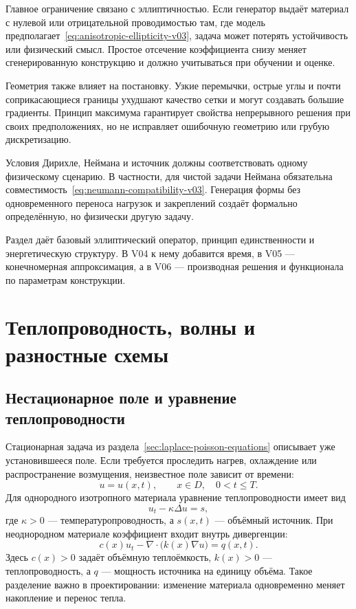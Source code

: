 Главное ограничение связано с эллиптичностью. Если генератор выдаёт материал с нулевой или отрицательной проводимостью там, где модель предполагает~\eqref{eq:anisotropic-ellipticity-v03}, задача может потерять устойчивость или физический смысл. Простое отсечение коэффициента снизу меняет сгенерированную конструкцию и должно учитываться при обучении и оценке.

Геометрия также влияет на постановку. Узкие перемычки, острые углы и почти соприкасающиеся границы ухудшают качество сетки и могут создавать большие градиенты. Принцип максимума гарантирует свойства непрерывного решения при своих предположениях, но не исправляет ошибочную геометрию или грубую дискретизацию.

Условия Дирихле, Неймана и источник должны соответствовать одному физическому сценарию. В частности, для чистой задачи Неймана обязательна совместимость~\eqref{eq:neumann-compatibility-v03}. Генерация формы без одновременного переноса нагрузок и закреплений создаёт формально определённую, но физически другую задачу.

Раздел даёт базовый эллиптический оператор, принцип единственности и энергетическую структуру. В V04 к нему добавится время, в V05 --- конечномерная аппроксимация, а в V06 --- производная решения и функционала по параметрам конструкции.

\section{Теплопроводность, волны и разностные схемы}
\label{sec:pde-time-dependent-and-finite-differences}

\subsection{Нестационарное поле и уравнение теплопроводности}

Стационарная задача из раздела~\ref{sec:laplace-poisson-equations} описывает уже установившееся поле. Если требуется проследить нагрев, охлаждение или распространение возмущения, неизвестное поле зависит от времени:
\[
u=u(x,t),
\qquad
x\in D,
\quad
0<t\leq T.
\]
Для однородного изотропного материала уравнение теплопроводности имеет вид
\begin{equation}
\label{eq:heat-equation-v04}
 u_t-\kappa\Delta u=s,
\end{equation}
где $\kappa>0$ --- температуропроводность, а $s(x,t)$ --- объёмный источник. При неоднородном материале коэффициент входит внутрь дивергенции:
\begin{equation}
\label{eq:heterogeneous-heat-equation-v04}
 c(x)u_t
 -\nabla\cdot\bigl(k(x)\nabla u\bigr)
 =q(x,t).
\end{equation}
Здесь $c(x)>0$ задаёт объёмную теплоёмкость, $k(x)>0$ --- теплопроводность, а $q$ --- мощность источника на единицу объёма. Такое разделение важно в проектировании: изменение материала одновременно меняет накопление и перенос тепла.

